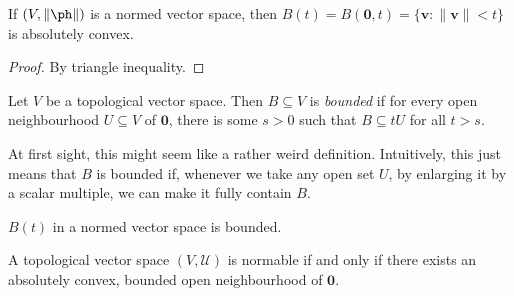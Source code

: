 \documentclass[a4paper]{article}
\begin{document}
\begin{prop}
  If $(V, \|\ph \|)$ is a normed vector space, then $B(t) = B(\mathbf{0}, t) = \{\mathbf{v}: \|\mathbf{v}\| < t\}$ is absolutely convex.
\end{prop}

\begin{proof}
  By triangle inequality.
\end{proof}

\begin{defi}
  Let $V$ be a topological vector space. Then $B\subseteq V$ is \emph{bounded} if for every open neighbourhood $U\subseteq V$ of $\mathbf{0}$, there is some $s > 0$ such that $B\subseteq t U$ for all $t > s$.
\end{defi}
At first sight, this might seem like a rather weird definition. Intuitively, this just means that $B$ is bounded if, whenever we take any open set $U$, by enlarging it by a scalar multiple, we can make it fully contain $B$.

\begin{eg}
  $B(t)$ in a normed vector space is bounded.
\end{eg}

\begin{prop}
  A topological vector space $(V, \mathcal{U})$ is normable if and only if there exists an absolutely convex, bounded open neighbourhood of $\mathbf{0}$.
\end{prop}
\end{document}

